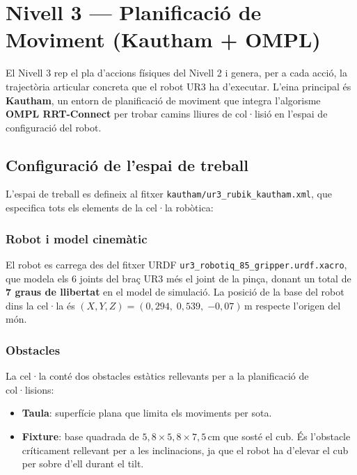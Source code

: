 \documentclass[12pt, a4paper]{article}
\begin{document}
\newpage
\newpage

\section{Nivell 3 — Planificació de Moviment (Kautham + OMPL)}

El Nivell 3 rep el pla d'accions físiques del Nivell 2 i genera, per a cada acció, la trajectòria articular concreta que el robot UR3 ha d'executar. L'eina principal és \textbf{Kautham}, un entorn de planificació de moviment que integra l'algorisme \textbf{OMPL RRT-Connect} per trobar camins lliures de col·lisió en l'espai de configuració del robot.

\subsection{Configuració de l'espai de treball}

L'espai de treball es defineix al fitxer \texttt{kautham/ur3\_rubik\_kautham.xml}, que especifica tots els elements de la cel·la robòtica:

\subsubsection{Robot i model cinemàtic}

El robot es carrega des del fitxer URDF \texttt{ur3\_robotiq\_85\_gripper.urdf.xacro}, que modela els 6 joints del braç UR3 més el joint de la pinça, donant un total de \textbf{7 graus de llibertat} en el model de simulació. La posició de la base del robot dins la cel·la és $(X, Y, Z) = (0{,}294,\; 0{,}539,\; {-0{,}07})$\,m respecte l'origen del món.

\subsubsection{Obstacles}

La cel·la conté dos obstacles estàtics rellevants per a la planificació de col·lisions:

\begin{itemize}
  \item \textbf{Taula}: superfície plana que limita els moviments per sota.
  \item \textbf{Fixture}: base quadrada de $5{,}8 \times 5{,}8 \times 7{,}5$\,cm que sosté el cub. És l'obstacle críticament rellevant per a les inclinacions, ja que el robot ha d'elevar el cub per sobre d'ell durant el tilt.
\end{itemize}
\end{document}
